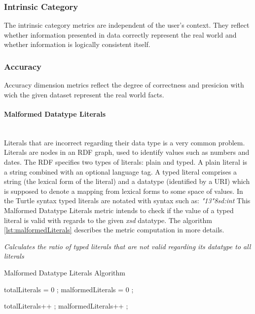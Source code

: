 
\subsubsection{Intrinsic Category}
\label{sec:Intrinsic}

The intrinsic category metrics are independent of the user's context.
They reflect whether information presented in data correctly represent the real world and whether information is logically consistent itself.
 


\subsubsection{Accuracy} %

Accuracy dimension metrics reflect the  degree of correctness and presicion with wich the given dataset represent the real world facts.


\paragraph{Malformed Datatype Literals} ~\\ %
Literals that are incorrect regarding their data type is a very common problem.
Literals are nodes in an RDF graph, used to identify values such as numbers and dates.
The RDF specifies two types of literals: plain and typed.
A plain literal is a string combined with an optional language tag.
A typed literal comprises a string (the lexical form of the literal) and a datatype (identified by a URI) which is supposed to denote a mapping from lexical forms to some space of values.
In the Turtle syntax typed literals are notated with syntax such as: \textit{"13"^^xsd:int}
This Malformed Datatype Literals metric intends to check if the value of a typed literal is valid with regards to the given \textit{xsd} datatype.
The algorithm \ref{lst:malformedLiterals} describes the metric computation in more details.

\begin{mdframed}[style=metricdefinition]
\emph{Calculates the ratio of typed literals that are not valid regarding its datatype to all literals}
\end{mdframed}

\begin{algorithm}
\caption{Malformed Datatype Literals Algorithm}\label{lst:malformedLiterals}
\begin{algorithmic}[1]
\State totalLiterals = 0 ;
\State malformedLiterals = 0 ;
\EndProcedure

 totalLiterals++ ;
 malformedLiterals++ ; \EndIf
 \EndIf
{}
\EndProcedure
\end{algorithmic}
\end{algorithm}

